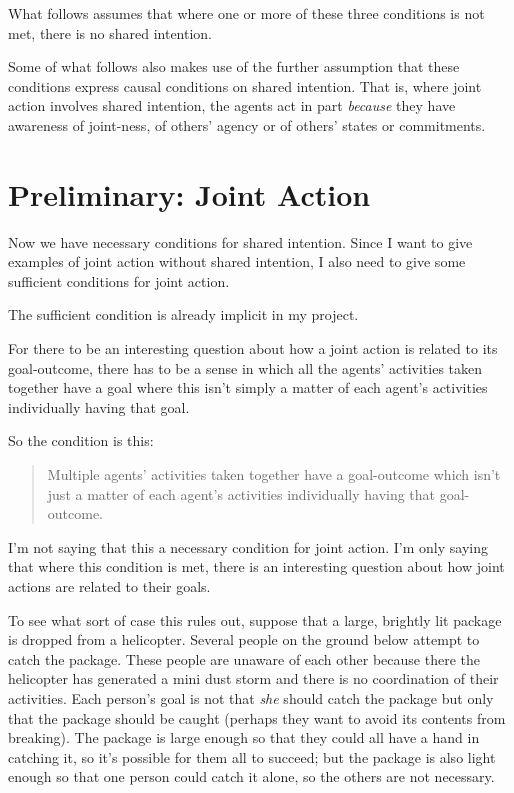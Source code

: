 \documentclass[12pt,a4paper]{extarticle}
\begin{document}
What follows assumes that where one or more of these three conditions is not met, there is no shared intention. 

Some of what follows also makes use of the further assumption that these conditions express causal conditions on shared intention.  That is, where joint action involves shared intention, the agents act in part \emph{because} they have awareness of joint-ness, of others' agency or of others' states or commitments.




\section{Preliminary: Joint Action}

Now we have necessary conditions for shared intention.  
Since I want to give examples of joint action without shared intention, I also need to give some sufficient conditions for joint action.  

The sufficient condition is already implicit in my project.

For there to be an interesting question about how a joint action is related to its goal-outcome, there has to be a sense in which all the agents' activities taken together have a goal where this isn’t simply a matter of each agent's activities individually having that goal. 

So the condition is this: 
\begin{quote}
Multiple agents' activities taken together have a goal-outcome which isn't just a matter of each agent's activities individually having that goal-outcome.
\end{quote}
I'm not saying that this a necessary condition for joint action.  I'm only saying that where this condition is met, there is an interesting question about how joint actions are related to their goals.

To see what sort of case this rules out, suppose that a large, brightly lit package is dropped from a helicopter.  Several people on the ground below attempt to catch the package.  These people are unaware of each other because there the helicopter has generated a mini dust storm and there is no coordination of their activities. 
Each person's goal is not that \emph{she} should catch the package but only that the package should be caught (perhaps they want to avoid its contents from breaking).  The package is large enough so that they could all have a hand in catching it, so it's possible for them all to succeed; but the package is also light enough so that one person could catch it alone, so the others are not necessary.   
\end{document}
